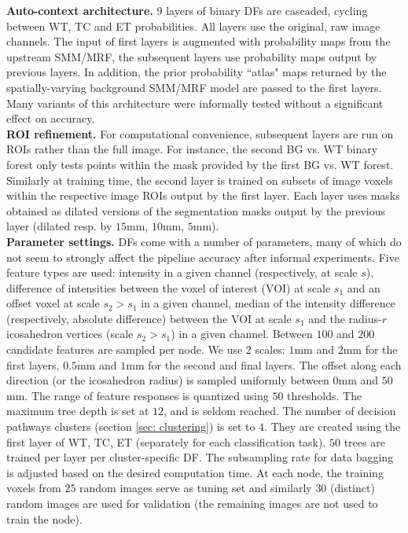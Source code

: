 \noindent
\textbf{Auto-context architecture.} $9$ layers of binary DFs are cascaded, cycling between WT, TC and ET probabilities. All layers use the original, raw image channels. The input of first layers is augmented with probability maps from the upstream SMM/MRF, the subsequent layers use probability maps output by previous layers. In addition, the prior probability ``atlas" maps returned by the spatially-varying background SMM/MRF model are passed to the first layers. Many variants of this architecture were informally tested without a significant effect on accuracy.\\

\noindent
\textbf{ROI refinement.} For computational convenience, subsequent layers are run on ROIs rather than the full image. For instance, the second BG vs. WT binary forest only tests points within the mask provided by the first BG vs. WT forest. Similarly at training time, the second layer is trained on subsets of image voxels within the respective image ROIs output by the first layer. Each layer uses masks obtained as dilated versions of the segmentation masks output by the previous layer (dilated resp. by $15$mm, $10$mm, $5$mm).\\

\noindent
\textbf{Parameter settings.} DFs come with a number of parameters, many of which do not seem to strongly affect the pipeline accuracy after informal experiments. Five feature types are used: intensity in a given channel (respectively, at scale $s$), difference of intensities between the voxel of interest (VOI) at scale $s_1$ and an offset voxel at scale $s_2\!>\! s_1$ in a given channel, median of the intensity difference (respectively, absolute difference) between the VOI at scale $s_1$ and the radius-$r$ icosahedron vertices (scale $s_2\! >\!s_1$) in a given channel. Between $100$ and $200$ candidate features are sampled per node. We use $2$ scales: $1$mm and $2$mm for the first layers, $0.5$mm and $1$mm for the second and final layers. The offset along each direction (or the icosahedron radius) is sampled uniformly between $0$mm and $50$mm. The range of feature responses is quantized using $50$ thresholds. The maximum tree depth is set at $12$, and is seldom reached. The number of decision pathways clusters (section \ref{sec: clustering}) is set to $4$. They are created using the first layer of WT, TC, ET (separately for each classification task). $50$ trees are trained per layer per cluster-specific DF. The subsampling rate for data bagging is adjusted based on the desired computation time. At each node, the training voxels from $25$ random images serve as tuning set and similarly $30$ (distinct) random images are used for validation (the remaining images are not used to train the node).

